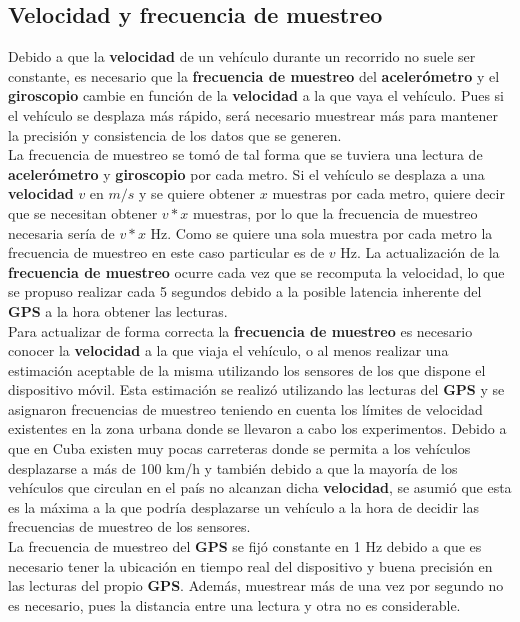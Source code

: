 	\subsection{Velocidad y frecuencia de muestreo}
		Debido a que la \textbf{velocidad} de un vehículo durante un recorrido no suele ser constante, es necesario que la \textbf
		{frecuencia de muestreo} del \textbf{acelerómetro} y el \textbf{giroscopio} cambie en función de la \textbf{velocidad}
		a la que vaya el vehículo. Pues si el vehículo se desplaza más rápido, será necesario muestrear más para mantener la
		precisión y consistencia de los datos que se generen.\\
		\indent La frecuencia de muestreo se tomó de tal forma que se tuviera una lectura de \textbf{acelerómetro} y \textbf
		{giroscopio} por cada metro. Si el vehículo se desplaza a una \textbf{velocidad} $v$ en $m/s$ y se quiere obtener
		$x$ muestras por cada metro, quiere decir que se necesitan obtener $v * x$ muestras, por lo que la frecuencia de muestreo
		necesaria sería de $v * x$ Hz. Como se quiere una sola muestra por cada metro la frecuencia de muestreo
		en este caso particular es de $v$ Hz. La actualización de la \textbf{frecuencia de muestreo} ocurre cada vez que se recomputa
		la velocidad, lo que se propuso realizar cada 5 segundos debido a la posible latencia inherente del \textbf{GPS} a la hora
		obtener las lecturas.\\
		\indent Para actualizar de forma correcta la \textbf{frecuencia de muestreo} es necesario conocer la \textbf{velocidad}
		a la que viaja el vehículo, o al menos realizar una estimación aceptable de la misma utilizando los sensores de
		los que dispone el dispositivo móvil. Esta estimación se realizó utilizando las lecturas del \textbf{GPS} y se 
		asignaron frecuencias de muestreo teniendo en cuenta los límites de velocidad existentes en la zona urbana donde 
		se llevaron a cabo los experimentos. Debido a que en Cuba existen muy pocas carreteras donde se permita a
		los vehículos desplazarse a más de 100 km/h y también debido a que la mayoría de los vehículos que circulan en
		el país no alcanzan dicha \textbf{velocidad}, se asumió que esta es la máxima a la que podría desplazarse un
		vehículo a la hora de decidir las frecuencias de muestreo de los sensores.\\
		\indent La frecuencia de muestreo del \textbf{GPS} se fijó constante en 1 Hz debido a que es necesario tener 
		la ubicación en tiempo real del dispositivo y buena precisión en las lecturas del propio \textbf{GPS}. Además, 
		muestrear más de una vez por segundo no es necesario, pues la distancia entre una lectura y otra no es considerable.\\

